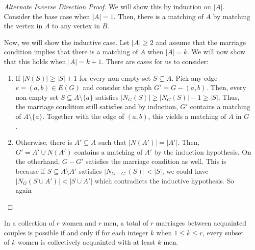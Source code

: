 \begin{proof}[Alternate Inverse Direction Proof]
  We will show this by induction on \(|A|\). Consider the base case when
  \(|A| = 1\). Then, there is a matching of \(A\) by matching the vertex in
  \(A\) to any vertex in \(B\).

  Now, we will show the inductive case. Let \(|A| \geq 2\) and assume that 
  the marriage condition implies that there is a matching of \(A\) when 
  \(|A| = k\). We will now show that this holds when \(|A| = k+1\). There are
  cases for us to consider: 
  \begin{enumerate}[label=\textit{Case \arabic*.}]
    \item If \(|N(S)| \geq |S| + 1\) for every non-empty set \(S \subsetneq A\).
      Pick any edge \(e = (a, b) \in E(G)\) and consider the graph \(G' =
      G-(a,b)\). Then, every non-empty set \(S \subseteq A \setminus \{a\}\)
      satisfies \(|N_G(S)| \geq |N_G(S)| - 1 \geq |S|\). Thus, the marriage
      condition still satisfies and by induction, \(G'\) contains a matching of
      \(A \setminus \{a\}\). Together with the edge of \((a, b)\), this yields a
      matching of \(A\) in \(G\).
    \item Otherwise, there is \(A' \subsetneq A\) such that \(|N(A')| = |A'|\). 
      Then, \(G' = A' \cup N(A')\) contains a matching of \(A'\) by the
      induction hypothesis. On the otherhand, \(G-G'\) satisfies the marriage
      condition as well. This is because if \(S \subseteq A \setminus A'\)
      satisfies \(|N_{G-G'}(S)| < |S|\), we could have \(|N_G(S \cup A')| < |S
      \cup A'|\) which contradicts the inductive hypothesis. So again
  \end{enumerate}
\end{proof}

\begin{theorem}
  In a collection of \(r\) women and \(r\) men, a total of \(r\) marriages 
  between acquainted couples is possible if and only if for each integer \(k\)
  when \(1 \leq k \leq r\), every subset of \(k\) women is collectively 
  acquainted with at least \(k\) men.
\end{theorem}

